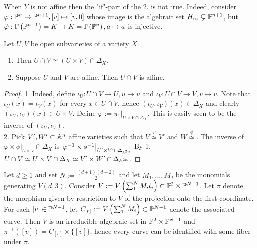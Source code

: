         \begin{remark}
            When $Y$ is not affine then the "if"-part of the 2. is not true. Indeed, consider $\varphi: \mathbb{P}^n\rightarrow \mathbb{P}^{n+1}, [v]\mapsto [v,0]$ whose image is the algebraic set $H_\infty \subsetneq \mathbb{P}^{n+1}$, but $\widetilde{\varphi}: \Gamma\left(\mathbb{P}^{n+1}\right)=K\rightarrow K= \Gamma\left(\mathbb{P}^n\right), a\mapsto a$ is injective. 
        \end{remark}
        \begin{proposition}
            Let $U,V$ be open subvarieties of a variety $X$.
            \begin{enumerate}
                \item Then $U\cap V\simeq (U\times V)\cap \Delta_X$.
                \item Suppose $U$ and $V$ are affine. Then $U\cap V$ is affine.
            \end{enumerate}
        \end{proposition}
        \begin{proof}
            1. Indeed, define $\iota_U: U\cap V\rightarrow U, u\mapsto u$ and $\iota_V: U\cap V\rightarrow V, v\mapsto v$. Note that $\iota_U(x)=\iota_V(x)$ for every $x\in U\cap V$, hence $(\iota_U,\iota_V)(x)\in \Delta_X$ and clearly $(\iota_U,\iota_V)(x)\in U\times V$. Define $\varphi := \left.\pi_1\right|_{U\times V\cap \Delta_X}$. This is easily seen to be the inverse of $(\iota_U,\iota_V)$.\\
            2. Pick $V',W'\subset \mathbb{A}^n$ affine varieties such that $V\overset{\varphi}{\simeq}V'$ and $W\overset{\phi}{\simeq}$. The inverse of $\left.\varphi\times \phi\right|_{U\times V}\cap \Delta_X$ is $\left.\varphi^{-1}\times \phi^{-1}\right|_{U'\times V'\cap \Delta_{\mathbb{A}^{2n}}}$ By 1. $U\cap V\simeq U\times V\cap \Delta_X \simeq V'\times W'\cap \Delta_{\mathbb{A}^{2n}}$.
        \end{proof}
        \begin{proposition}
            Let $d\geq 1$ and set $N:=\frac{(d+1)(d+2)}{2}$ and let $M_1,\dots,M_d$ be the monomials generating $V(d,3)$. Consider $V:= V\left(\sum_1^N M_it_i\right)\subset \mathbb{P}^2\times\mathbb{P}^{N-1}$. Let $\pi$ denote the morphism given by restriction to $V$ of the projection onto the first coordinate. For each $[v]\in \mathbb{P}^{N-1}$, let $C_{[v]}:=V\left(\sum_1^N M_i\right)\subset \mathbb{P}^{N-1}$ denote the associated curve. Then $V$ is an irreducible algebraic set in $\mathbb{P}^{2}\times\mathbb{P}^{N-1}$ and $\pi^{-1}([v])=C_{[v]}\times \{[v]\}$, hence every curve can be identified with some fiber under $\pi$. 
        \end{proposition}
